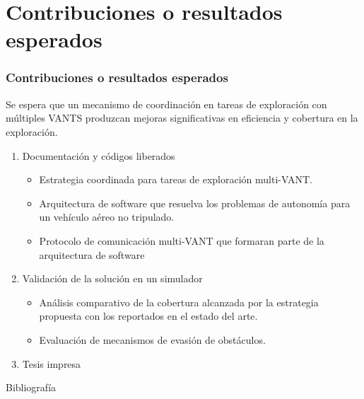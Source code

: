 \documentclass[
  24pt, %
  aspectratio=169, %
]{beamer}
\begin{document}
\section{Contribuciones o resultados esperados}
\begin{frame}
  \frametitle{Contribuciones o resultados esperados}
  \small Se espera que un mecanismo de coordinación en tareas de exploración con múltiples VANTS produzcan mejoras significativas en eficiencia y cobertura en la exploración.
  \begin{enumerate}
  \item<1-> \small Documentación y códigos liberados
    \begin{itemize}
    \item \small Estrategia coordinada para tareas de exploración multi-VANT.
    \item \small Arquitectura de software que resuelva los problemas de autonomía para un vehículo aéreo no tripulado.
    \item \small Protocolo de comunicación multi-VANT que formaran parte de la arquitectura de software
    \end{itemize}
  \item<2-> \small Validación de la solución en un simulador
    \begin{itemize}
    \item \small Análisis comparativo de la cobertura alcanzada por la estrategia propuesta con los reportados en el estado del arte.
    \item \small Evaluación de mecanismos de evasión de obstáculos.
    \end{itemize}
  \item<3-> Tesis impresa
  \end{enumerate}
\end{frame}

\begin{frame}{Bibliografía}
  \tiny
  
  
\end{frame}
\end{document}

